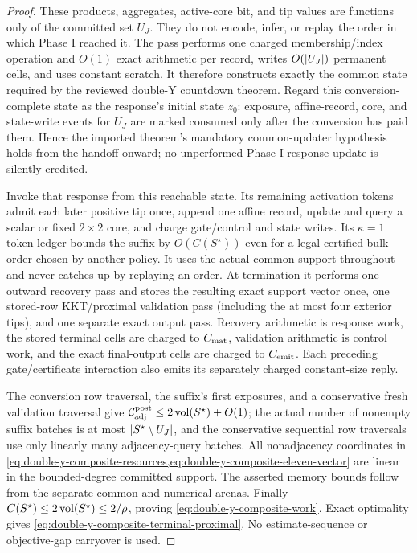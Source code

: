 \begin{proof}
These products, aggregates, active-core bit, and tip values are functions only
of the committed set $U_J$.  They do not encode, infer, or replay the order in
which Phase I reached it.  The pass performs one charged membership/index
operation and $O(1)$ exact arithmetic per record, writes
$O(\left\lvert U_J \right\rvert)$ permanent cells, and uses constant scratch.  It therefore
constructs exactly the common state required by the reviewed double-Y
countdown theorem.  Regard this conversion-complete state as the response's
initial state $z_0$: exposure, affine-record, core, and state-write events for
$U_J$ are marked consumed only after the conversion has paid them.  Hence the
imported theorem's mandatory common-updater hypothesis holds from the handoff
onward; no unperformed Phase-I response update is silently credited.

Invoke that response from this reachable state.  Its remaining activation
tokens admit each later positive tip once, append one affine record, update
and query a scalar or fixed $2\times2$ core, and charge gate/control and state
writes.  Its $\kappa=1$ token ledger bounds the suffix by
$O(C(S^\star))$ even for a legal certified bulk order chosen by another
policy.  It uses the actual common support throughout and never catches up by
replaying an order.  At termination it performs one outward recovery pass and
stores the resulting exact support vector once, one stored-row KKT/proximal
validation pass (including the at most four exterior tips), and one separate
exact output pass.  Recovery arithmetic is response work, the stored terminal
cells are charged to $C_{\rm mat}$, validation arithmetic is control work, and
the exact final-output cells are charged to $C_{\rm emit}$.  Each preceding
gate/certificate interaction also emits its separately charged constant-size
reply.

The conversion row traversal, the suffix's first exposures, and a conservative
fresh validation traversal give
$\mathcal C_{\rm adj}^{\rm post}\leq2\operatorname{vol}(S^\star)+O(1)$; the actual number of
nonempty suffix batches is at most $\left\lvert S^\star\setminus U_J \right\rvert$, and the
conservative sequential row traversals use only linearly many adjacency-query
batches.  All nonadjacency coordinates in
\cref{eq:double-y-composite-resources,eq:double-y-composite-eleven-vector} are
linear in the bounded-degree committed support.  The asserted memory bounds
follow from the separate common and numerical arenas.  Finally
$C(S^\star)\leq2\operatorname{vol}(S^\star)\leq2/\rho$, proving
\cref{eq:double-y-composite-work}.  Exact optimality gives
\cref{eq:double-y-composite-terminal-proximal}.  No estimate-sequence or
objective-gap carryover is used.
\end{proof}

